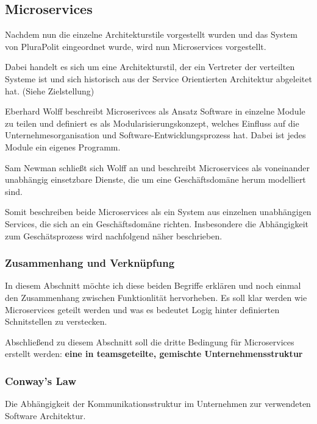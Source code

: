 \subsection{Microservices}

Nachdem nun die einzelne Architekturstile vorgestellt wurden und das System von PluraPolit eingeordnet wurde, wird nun Microservices vorgestellt.

Dabei handelt es sich um eine Architekturstil, der ein Vertreter der verteilten Systeme ist und sich historisch aus der Service Orientierten Architektur abgeleitet hat. (Siehe Zielstellung)

Eberhard Wolff beschreibt Microserivces als Ansatz Software in einzelne Module zu teilen und definiert es als Modularisierungskonzept, welches Einfluss auf die Unternehmesorganisation und Software-Entwicklungsprozess hat. Dabei ist jedes Module ein eigenes Programm.

Sam Newman schließt sich Wolff an und beschreibt Microservices als voneinander unabhängig einsetzbare Dienste, die um eine Geschäftsdomäne herum modelliert sind.

Somit beschreiben beide Microservices als ein System aus einzelnen unabhängigen Services, die sich an ein Geschäftsdomäne richten. Insbesondere die Abhängigkeit zum Geschätsprozess wird nachfolgend näher beschrieben.


\subsubsection{Zusammenhang und Verknüpfung}

In diesem Abschnitt möchte ich diese beiden Begriffe erklären und noch einmal den Zusammenhang zwischen Funktionlität hervorheben. Es soll klar werden wie Microservices geteilt werden und was es bedeutet Logig hinter definierten Schnitstellen zu verstecken.

Abschließend zu diesem Abschnitt soll die dritte Bedingung für Microservices erstellt werden: \textbf{eine in teamsgeteilte, gemischte Unternehmensstruktur}

\subsubsection{Conway's Law}

Die Abhängigkeit der Kommunikationsstruktur im Unternehmen zur verwendeten Software Architektur.

